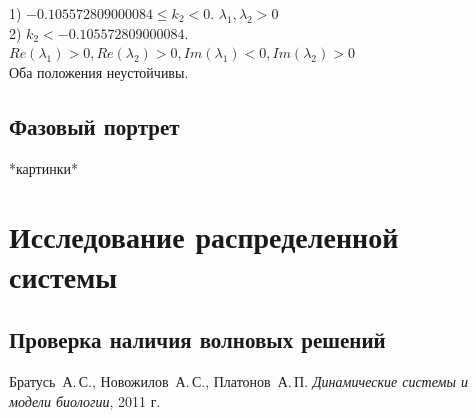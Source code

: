 \documentclass[oneside, final, 12pt]{article}
\begin{document}
1) \( -0.105572809000084 \leq k_2 < 0\).
\(
\lambda_1, \lambda_2 > 0
\)\\

2) \(k_2 < -0.105572809000084 \).
\( Re(\lambda_1)>0, Re(\lambda_2)>0, Im(\lambda_1)<0, Im(\lambda_2)>0 \)\\

Оба положения неустойчивы.\\

\subsection{Фазовый портрет}

*картинки*

\newpage
\section{Исследование распределенной системы}
\subsection{Проверка наличия волновых решений}




\newpage
\clearpage
\begin{thebibliography}{0}
	Братусь~А.\,С., Новожилов~А.\,С., Платонов~А.\,П. \label{Bratus_book}
	\emph{Динамические системы и модели биологии},
	2011 г.
\end{thebibliography}
\end{document}

